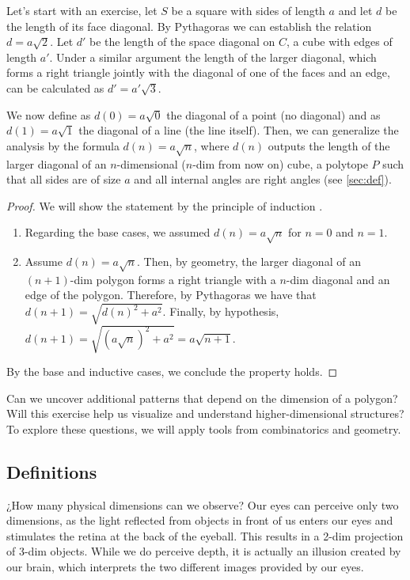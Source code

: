 \documentclass{article}
\begin{document}
	Let's start with an exercise, let $S$ be a square \cite{euclid} with sides of length $a$ and let $d$ be the length of its face diagonal. By Pythagoras \cite{euclid} we can establish the relation $d=a\sqrt{2}$. Let $d'$ be the length of the space diagonal on $C$, a cube \cite{euclid} with edges of length $a'$. Under a similar argument the length of the larger diagonal, which forms a right triangle jointly with the diagonal of one of the faces and an edge, can be calculated as $d'=a'\sqrt{3}$.
	
	We now define as $d(0) = a\sqrt{0}$ the diagonal of a point (no diagonal) and as $d(1) = a\sqrt{1}$ the diagonal of a line (the line itself). Then, we can generalize the analysis by the formula $d(n) = a\sqrt{n}$, where $d(n)$ outputs the length of the larger diagonal of an $n$-dimensional ($n$-dim from now on) cube, a polytope $P$ such that all sides are of size $a$ and all internal angles are right angles \cite{coxeter1973regular} (see \autoref{sec:def}).

	\begin{proof}
		We will show the statement by the principle of induction \cite{rosen2011discrete}.
		\begin{enumerate}
			\item Regarding the base cases, we assumed $d(n)=a\sqrt{n}$ for $n=0$ and $n=1$.
			
			\item Assume $d(n)=a\sqrt{n}$. Then, by geometry, the larger diagonal of an $(n+1)$-dim polygon forms a right triangle with a $n$-dim diagonal and an edge of the polygon. Therefore, by Pythagoras we have that $d(n+1) = \sqrt{d(n)^2 + a^2}$. Finally, by hypothesis, $d(n+1) = \sqrt{(a\sqrt{n})^2 + a^2} = a \sqrt{n + 1}$.
		\end{enumerate}
		By the base and inductive cases, we conclude the property holds.
	\end{proof}

	Can we uncover additional patterns that depend on the dimension of a polygon? Will this exercise help us visualize and understand higher-dimensional structures? To explore these questions, we will apply tools from combinatorics and geometry.

	
	\subsection{Definitions \label{sec:def}}
	
	¿How many physical dimensions can we observe? Our eyes can perceive only two dimensions, as the light reflected from objects in front of us enters our eyes and stimulates the retina at the back of the eyeball. This results in a 2-dim projection of 3-dim objects. While we do perceive depth, it is actually an illusion created by our brain, which interprets the two different images provided by our eyes.
	
\end{document}
